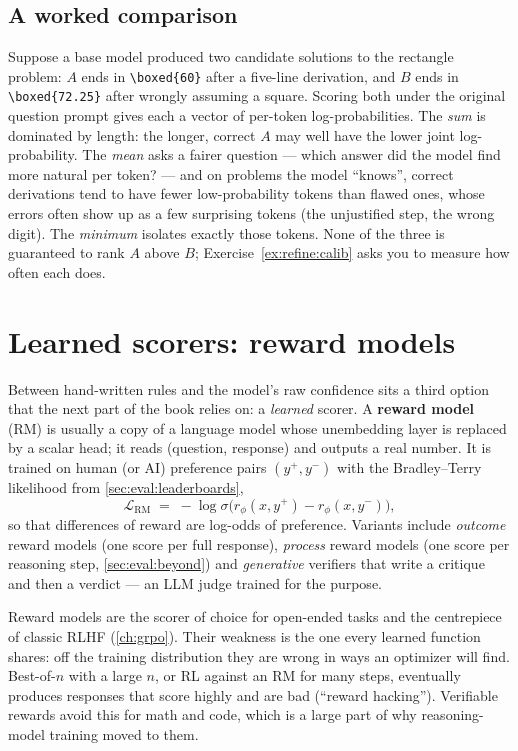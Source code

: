 \subsection{A worked comparison}
Suppose a base model produced two candidate solutions to the rectangle problem: $A$ ends in
\texttt{\textbackslash boxed\{60\}} after a five-line derivation, and $B$ ends in
\texttt{\textbackslash boxed\{72.25\}} after wrongly assuming a square. Scoring both under the original
question prompt gives each a vector of per-token log-probabilities. The \emph{sum} is dominated by
length: the longer, correct $A$ may well have the lower joint log-probability. The \emph{mean} asks a
fairer question --- which answer did the model find more natural per token? --- and on problems the
model ``knows'', correct derivations tend to have fewer low-probability tokens than flawed ones,
whose errors often show up as a few surprising tokens (the unjustified step, the wrong digit). The
\emph{minimum} isolates exactly those tokens. None of the three is guaranteed to rank $A$ above $B$;
Exercise~\ref{ex:refine:calib} asks you to measure how often each does.

\section{Learned scorers: reward models}\label{sec:refine:rm}

Between hand-written rules and the model's raw confidence sits a third option that the next part of
the book relies on: a \emph{learned} scorer. A \textbf{reward model} (RM) is usually a copy of a
language model whose unembedding layer is replaced by a scalar head; it reads (question, response)
and outputs a real number. It is trained on human (or AI) preference pairs $(y^+, y^-)$ with the
Bradley--Terry likelihood from \cref{sec:eval:leaderboards},
\begin{equation}
  \mathcal{L}_{\text{RM}} \;=\; -\log \sigma\bigl(r_\phi(x, y^+) - r_\phi(x, y^-)\bigr),
\end{equation}
so that differences of reward are log-odds of preference. Variants include \emph{outcome} reward
models (one score per full response), \emph{process} reward models (one score per reasoning step,
\cref{sec:eval:beyond}) and \emph{generative} verifiers that write a critique and then a verdict ---
an LLM judge trained for the purpose.

Reward models are the scorer of choice for open-ended tasks and the centrepiece of classic RLHF
(\cref{ch:grpo}). Their weakness is the one every learned function shares: off the training
distribution they are wrong in ways an optimizer will find. Best-of-$n$ with a large $n$, or RL
against an RM for many steps, eventually produces responses that score highly and are bad
(``reward hacking''). Verifiable rewards avoid this for math and code, which is a large part of why
reasoning-model training moved to them.

